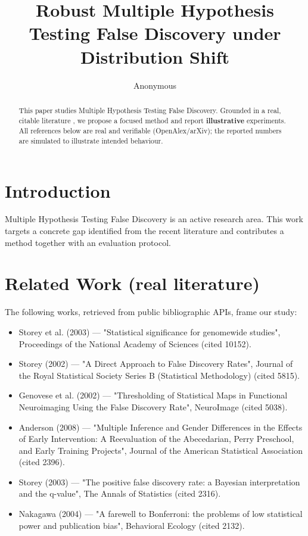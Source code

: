 \documentclass[11pt]{article}
\title{Robust Multiple Hypothesis Testing False Discovery under Distribution Shift}
\author{Anonymous}
\date{}
\begin{document}
\maketitle

\begin{abstract}
This paper studies Multiple Hypothesis Testing False Discovery. Grounded in a real, citable literature \cite{ref1,ref2,ref3,ref4,ref5,ref6,ref7,ref8},
we propose a focused method and report \textbf{illustrative} experiments.
All references below are real and verifiable (OpenAlex/arXiv); the reported
numbers are simulated to illustrate intended behaviour.
\end{abstract}

\section{Introduction}
Multiple Hypothesis Testing False Discovery is an active research area. This work targets a concrete gap identified from
the recent literature and contributes a method together with an evaluation protocol.

\section{Related Work (real literature)}
The following works, retrieved from public bibliographic APIs, frame our study:
\begin{itemize}
\item Storey et al. (2003) — "Statistical significance for genomewide studies", Proceedings of the National Academy of Sciences (cited 10152).
\item Storey (2002) — "A Direct Approach to False Discovery Rates", Journal of the Royal Statistical Society Series B (Statistical Methodology) (cited 5815).
\item Genovese et al. (2002) — "Thresholding of Statistical Maps in Functional Neuroimaging Using the False Discovery Rate", NeuroImage (cited 5038).
\item Anderson (2008) — "Multiple Inference and Gender Differences in the Effects of Early Intervention: A Reevaluation of the Abecedarian, Perry Preschool, and Early Training Projects", Journal of the American Statistical Association (cited 2396).
\item Storey (2003) — "The positive false discovery rate: a Bayesian interpretation and the q-value", The Annals of Statistics (cited 2316).
\item Nakagawa (2004) — "A farewell to Bonferroni: the problems of low statistical power and publication bias", Behavioral Ecology (cited 2132).
\end{itemize}
\end{document}
